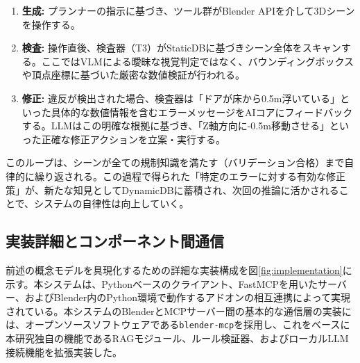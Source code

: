\documentclass{deimj}
\begin{document}
\begin{enumerate}
  \item \textbf{生成:} プランナーの指示に基づき、ツール群がBlender APIを介して3Dシーンを操作する。
  \item \textbf{検査:} 操作直後、検査器（T3）がStaticDBに基づきシーン全体をスキャンする。ここではVLMによる曖昧な視覚判定ではなく、バウンディングボックスや頂点座標に基づいた厳密な数値検証が行われる。
  \item \textbf{修正:} 違反が検出された場合、検査器は「ドアが床から0.5m浮いている」といった具体的な数値情報を含むエラーメッセージをAIコアにフィードバックする。LLMはこの明確な根拠に基づき、「Z軸方向に-0.5m移動させる」といった正確な修正アクションを立案・実行する。
\end{enumerate}

このループは、シーンが全ての規制知識を満たす（バリデーション合格）まで自律的に繰り返される。この過程で得られた「特定のエラーに対する有効な修正策」が、新たな知見としてDynamicDBに蓄積され、次回の推論に活かされることで、システムの自律性は向上していく。

\subsection{実装詳細とコンポーネント間通信}

前述の概念モデルを具現化するための詳細な実装構成を図\ref{fig:implementation}に示す。本システムは、Pythonベースのクライアント、FastMCPを用いたサーバー、およびBlender内のPython環境で動作するアドオンの相互連携によって実現されている。本システムのBlenderとMCPサーバー間の基本的な通信層の実装には、オープンソースソフトウェアである\texttt{blender-mcp}\cite{ahuja2025blendermcp}を採用し、これをベースに本研究独自の機能であるRAGモジュール、ルール検証器、およびローカルLLM接続機能を拡張実装した。
\end{document}
